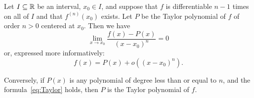 \begin{theorem}
\label{th:taylor_peano}%
\mymark{***}%
%
%
%
Let $I\subseteq {\mathbb R}$ be an interval, $x_0\in I$, 
and suppose that $f$ is differentiable $n-1$ times on all of $I$
and that $f^{(n)}(x_0)$ exists.
%
Let $P$ be the Taylor polynomial of $f$ of order $n>0$ centered at $x_0$. 
Then we have
\begin{equation}\label{eq:taylor_peano}
  \lim_{x\to x_0}\frac{f(x) - P(x)}{(x-x_0)^n} = 0
\end{equation}
or, expressed more informatively:
\begin{equation}\label{eq:Taylor}
  f(x) = P(x) + o((x-x_0)^n).
\end{equation}

Conversely, if $P(x)$ is any polynomial of degree less than or equal to $n$, and
the
formula~\eqref{eq:Taylor} holds, then $P$ is the Taylor polynomial of $f$.
\end{theorem}
%
